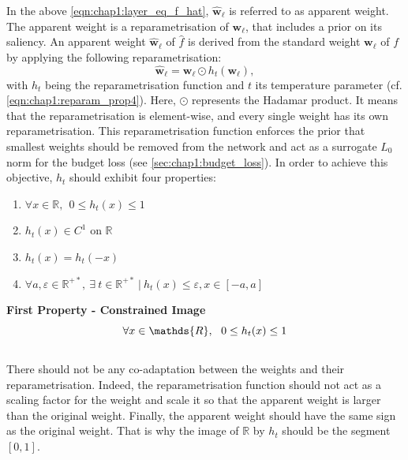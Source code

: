 \noindent In the above \cref{eqn:chap1:layer_eq_f_hat}, $\mathbf{\hat w}_\ell$
is referred to as apparent weight. The apparent weight is a reparametrisation of
$\mathbf{w}_\ell$, that includes a prior on its saliency. An apparent weight
$\mathbf{\hat w}_\ell$ of $\hat{f}$ is derived from the standard weight
$\mathbf{w}_\ell$ of $f$ by applying the following reparametrisation: 
\begin{equation}
  \label{eqn:reparam}
  \mathbf{\hat w}_\ell = \mathbf{w}_\ell  \odot h_t(\mathbf{w}_\ell),
\end{equation}
\noindent with $h_t$ being the reparametrisation function and $t$ its
temperature parameter (cf. \cref{eqn:chap1:reparam_prop4}). Here, $\odot$ represents the Hadamar product. It means
that the reparametrisation is element-wise, and every single weight has its own
reparametrisation. This reparametrisation function enforces the prior that
smallest weights should be removed from the network and act as a surrogate $L_0$
norm for the budget loss (see \cref{sec:chap1:budget_loss}). In order to achieve
this objective, $h_t$ should exhibit four properties: \\

\begin{enumerate}
  \item $\forall x \in \mathds{R},~~ 0 \leq h_t(x) \leq 1 $
  \item $h_t(x) \in C^1 \text{ on } \mathds{R}$
  \item $h_t(x) = h_t(-x)$
  \item $\forall a,\varepsilon \in\mathds{R}^{+\ast},~ \exists ~t
  \in\mathds{R}^{+\ast} ~ | ~ h_t(x) \leq \varepsilon, x \in [-a,a]$
\end{enumerate}

\noindent\textbf{First Property - Constrained Image} \\
\begin{equation}
    \centering
    \forall x \in \mathds{R},~~ 0 \leq h_t(x) \leq 1
    \label{eqn:chap1:reparam_prop1}
\end{equation}
\\
There should not be any co-adaptation between the weights and their
reparametrisation. Indeed, the reparametrisation function should not act as a
scaling factor for the weight and scale it so that the apparent weight is larger
than the original weight. Finally, the apparent weight should have the same sign
as the original weight. That is why the image of $\mathbb{R}$ by $h_t$ should be
the segment $[0,1]$.\\

